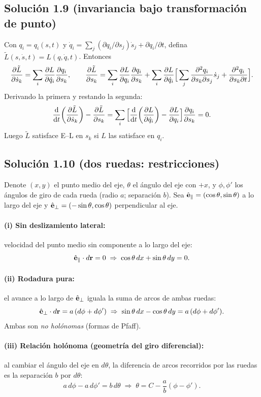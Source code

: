 \subsection*{Solución 1.9 (invariancia bajo transformación de punto)}
Con $q_i=q_i(s,t)$ y
$\dot q_i=\sum_j (\partial q_i/\partial s_j)\dot s_j+\partial q_i/\partial t$,
defina $\tilde L(s,\dot s,t)=L(q,\dot q,t)$. Entonces
\[
\pdv{\tilde L}{\dot s_k}=\sum_i \pdv{L}{\dot q_i}\pdv{q_i}{s_k},\qquad
\pdv{\tilde L}{s_k}=\sum_i \pdv{L}{q_i}\pdv{q_i}{s_k}
+\sum_i \pdv{L}{\dot q_i}\Big[\sum_j \pdv[2]{q_i}{s_k}{s_j}\dot s_j+\pdv[2]{q_i}{s_k}{t}\Big].
\]
Derivando la primera y restando la segunda:
\[
\dv{t}\!\left(\pdv{\tilde L}{\dot s_k}\right)-\pdv{\tilde L}{s_k}
=\sum_i\Big[\dv{t}\!\left(\pdv{L}{\dot q_i}\right)-\pdv{L}{q_i}\Big]\pdv{q_i}{s_k}=0.
\]
Luego $\tilde L$ satisface E–L en $s_k$ si $L$ las satisface en $q_i$.

\subsection*{Solución 1.10 (dos ruedas: restricciones)}
Denote $(x,y)$ el punto medio del eje, $\theta$ el ángulo del eje con $+x$,
y $\phi,\phi'$ los ángulos de giro de cada rueda (radio $a$; separación $b$).
Sea $\hat{\vb e}_\parallel=(\cos\theta,\sin\theta)$ a lo largo del eje y
$\hat{\vb e}_\perp=(-\sin\theta,\cos\theta)$ perpendicular al eje.
\paragraph{(i) Sin deslizamiento lateral:}
velocidad del punto medio sin componente a lo largo del eje:
\[
\hat{\vb e}_\parallel\cdot d\vb r=0
\;\Rightarrow\;
\cos\theta\,dx+\sin\theta\,dy=0.
\]
\paragraph{(ii) Rodadura pura:}
el avance a lo largo de $\hat{\vb e}_\perp$ iguala la suma de arcos de ambas ruedas:
\[
\hat{\vb e}_\perp\cdot d\vb r=a\,(d\phi+d\phi')
\;\Rightarrow\;
\sin\theta\,dx-\cos\theta\,dy=a\,(d\phi+d\phi').
\]
Ambas son \emph{no holónomas} (formas de Pfaff).
\paragraph{(iii) Relación holónoma (geometría del giro diferencial):}
al cambiar el ángulo del eje en $d\theta$, la diferencia de arcos recorridos por las ruedas es
la separación $b$ por $d\theta$:
\[
a\,d\phi-a\,d\phi'=b\,d\theta
\;\Rightarrow\;
\theta=C-\frac{a}{b}(\phi-\phi').
\]
	



 \newpage





